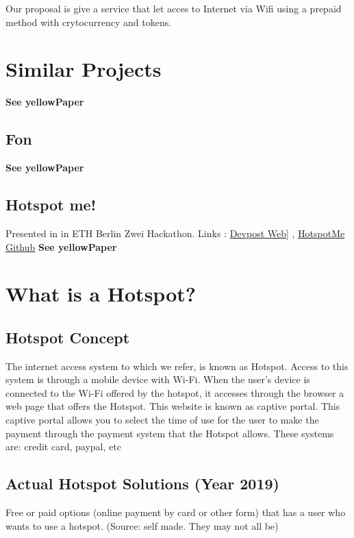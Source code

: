 \documentclass[12pt]{report}
\begin{document}
  Our proposal is give a service that let acces to Internet via Wifi using a prepaid method with crytocurrency and tokens.

  \section{Similar Projects} \label{ch:similar-projects}
  \textbf{ See yellowPaper}

  \subsection{Fon} \label{ch:fon}
  \textbf{ See yellowPaper}

  \subsection{Hotspot me!} \label{ch:ethberlinzwei}
  Presented in in ETH Berlin Zwei Hackathon.
  Links : \href{https://devpost.com/software/hotspot-me}{Devpost Web]} , \href{https://github.com/freeatnet/ethBerlin-HotspotMe}{HotspotMe Github}
	\textbf{ See yellowPaper}

	\section{What is a Hotspot?} \label{ch:hotspot}

	\subsection{Hotspot Concept} \label{ch:hotspot-concept}
  The internet access system to which we refer, is known as Hotspot. Access to this system is through a mobile device with Wi-Fi. When the user's device is connected to the Wi-Fi offered by the hotspot, it accesses through the browser a web page that offers the Hotspot. This website is known as captive portal. This captive portal allows you to select the time of use for the user to make the payment through the payment system that the Hotspot allows. These systems are: credit card, paypal, etc

	\subsection{Actual Hotspot Solutions (Year 2019)} \label{ch:hotspot-solution}

  Free or paid options (online payment by card or other form) that has a user who wants to use a hotspot. (Source: self made. They may not all be)
\end{document}
